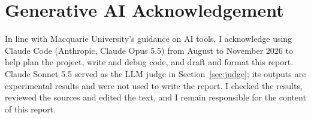 \documentclass[11pt]{article}
\begin{document}
\section*{Generative AI Acknowledgement}

In line with Macquarie University's guidance on AI tools, I acknowledge using Claude Code (Anthropic, Claude Opus 5.5) from August to November 2026 to help plan the project, write and debug code, and draft and format this report. Claude Sonnet 5.5 served as the LLM judge in Section~\ref{sec:judge}; its outputs are experimental results and were not used to write the report. I checked the results, reviewed the sources and edited the text, and I remain responsible for the content of this report.


\end{document}
